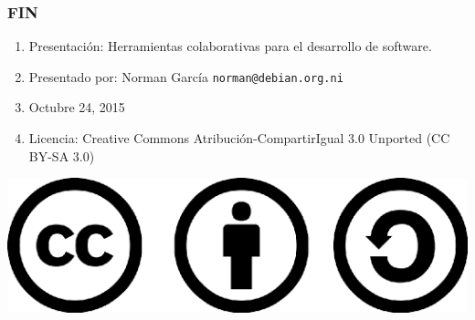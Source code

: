 \documentclass{beamer}
\begin{document}
\begin{frame}
\frametitle{FIN}
	\begin{enumerate}
		\item Presentaci\'on: Herramientas colaborativas para el desarrollo de software.
		\item Presentado por: Norman Garc\'ia  \texttt{norman@debian.org.ni}
		\item Octubre 24, 2015
		\item Licencia: Creative Commons Atribuci\'on-CompartirIgual 3.0 Unported (CC BY-SA 3.0)
	\end{enumerate}

	\begin{center}
  		 \includegraphics[scale=0.20]{../img/cclogo.png}
	\end{center}

\end{frame}
\end{document}

